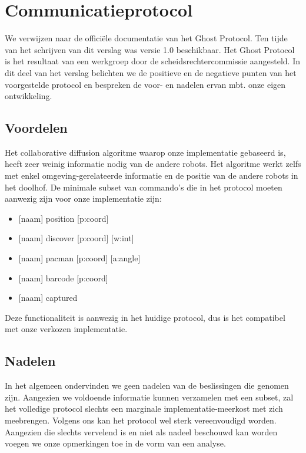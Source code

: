 \documentclass[12pt,a4paper]{report}
\begin{document}
\section{Communicatieprotocol}

We verwijzen naar de offici\"ele documentatie van het Ghost Protocol. Ten tijde van het schrijven van dit verslag was versie 1.0 beschikbaar. Het Ghost Protocol is het resultaat van een werkgroep door de scheidsrechtercommissie aangesteld. In dit deel van het verslag belichten we de positieve en de negatieve punten van het voorgestelde protocol en bespreken de voor- en nadelen ervan mbt. onze eigen ontwikkeling.

\subsection{Voordelen}

Het collaborative diffusion algoritme waarop onze implementatie gebaseerd is, heeft zeer weinig informatie nodig van de andere robots. Het algoritme werkt zelfs met enkel omgeving-gerelateerde informatie en de positie van de andere robots in het doolhof. De minimale subset van commando's die in het protocol moeten aanwezig zijn voor onze implementatie zijn:

\begin{itemize}
	\item{ [naam] position [p:coord]}
	\item{ [naam] discover [p:coord] [w:int]}
	\item{ [naam] pacman [p:coord] [a:angle]}
	\item{ [naam] barcode [p:coord] }
	\item{ [naam] captured }
\end{itemize}

Deze functionaliteit is aanwezig in het huidige protocol, dus is het compatibel met onze verkozen implementatie.

\subsection{Nadelen}

In het algemeen ondervinden we geen nadelen van de beslissingen die genomen zijn. Aangezien we voldoende informatie kunnen verzamelen met een subset, zal het volledige protocol slechts een marginale implementatie-meerkost met zich meebrengen. Volgens ons kan het protocol wel sterk vereenvoudigd worden. Aangezien die slechts vervelend is en niet als nadeel beschouwd kan worden voegen we onze opmerkingen toe in de vorm van een analyse.
\end{document}
